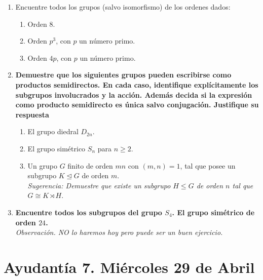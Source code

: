 \documentclass{article}
\theoremstyle{definition}
\theoremstyle{remark}
\numberwithin{equation}{section}
\begin{document}
\begin{enumerate}
\item Encuentre todos los grupos (salvo isomorfismo) de los ordenes dados:
\begin{enumerate}
\item Orden $8$.
\item Orden $p^3$, con $p$ un número primo.
\item Orden $4p$, con $p$ un número primo.
\end{enumerate}

\item \textbf{Demuestre que los siguientes grupos pueden escribirse como productos semidirectos. En cada caso, identifique explícitamente los subgrupos involucrados y la acción. Además decida si la expresión como producto semidirecto es única salvo conjugación. Justifique su respuesta}

\begin{enumerate}

\item El grupo diedral $D_{2n}$.

\item El grupo simétrico $S_n$ para $n \geq 2$.

\item Un grupo $G$ finito de orden $mn$ con $(m,n)=1$, tal que posee un subgrupo $K \trianglelefteq G$ de orden $m$.\\
\textit{Sugerencia: Demuestre que existe un subgrupo $H \leq G$ de orden $n$ tal que 
$G \cong K \rtimes H.$}

\end{enumerate}


\item \textbf{Encuentre todos los subgrupos del grupo $S_4$. El grupo simétrico de orden $24$.\\}
\textit{Observación. NO lo haremos hoy pero puede ser un buen ejercicio.}

\end{enumerate}


\newpage
\section{Ayudantía 7. Miércoles 29 de Abril}
\end{document}
